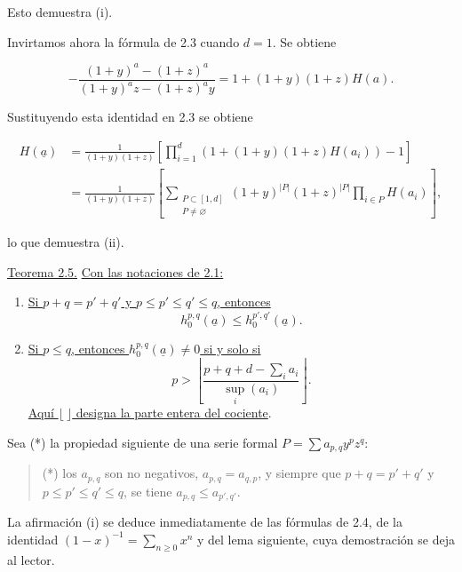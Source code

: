 Esto demuestra (i).

Invirtamos ahora la fórmula de 2.3 cuando $d=1$. Se obtiene

\begin{equation*}
-\frac{(1+y)^a-(1+z)^a}{(1+y)^az-(1+z)^ay}
=1+(1+y)(1+z)H(a).
\end{equation*}

Sustituyendo esta identidad en 2.3 se obtiene

\begin{align*}
H(\underline a)
&=\frac{1}{(1+y)(1+z)}\left[
\prod_{i=1}^d\left(1+(1+y)(1+z)H(a_i)\right)-1\right]\\
&=\frac{1}{(1+y)(1+z)}\left[
\sum_{\substack{P\subset[1,d]\\P\ne\varnothing}}
(1+y)^{|P|}(1+z)^{|P|}\prod_{i\in P}H(a_i)\right],
\end{align*}

lo que demuestra (ii).

\medskip
\noindent\underline{Teorema 2.5.}\quad
\underline{Con las notaciones de 2.1:}

\begin{enumerate}[label=(\roman*),leftmargin=2.6em]
\item \underline{Si $p+q=p'+q'$ y $p\leq p'\leq q'\leq q$, entonces}
\begin{equation*}
h_0^{p,q}(\underline a)\leq h_0^{p',q'}(\underline a).
\end{equation*}

\item \underline{Si $p\leq q$, entonces $h_0^{p,q}(\underline a)\ne0$ si
y solo si}
\begin{equation*}
p>\left\lfloor
\frac{p+q+d-\sum_i a_i}{\sup_i(a_i)}
\right\rfloor.
\end{equation*}
\underline{Aquí $\lfloor\ \rfloor$ designa la parte entera del cociente}.
\end{enumerate}

\pageoriginale

Sea (*) la propiedad siguiente de una serie formal
$P=\sum a_{p,q}y^pz^q$:

\begin{quote}
(*) los $a_{p,q}$ son no negativos, $a_{p,q}=a_{q,p}$, y siempre que
$p+q=p'+q'$ y $p\leq p'\leq q'\leq q$, se tiene
$a_{p,q}\leq a_{p',q'}$.
\end{quote}

La afirmación (i) se deduce inmediatamente de las fórmulas de 2.4, de la
identidad $(1-x)^{-1}=\sum_{n\geq0}x^n$ y del lema siguiente, cuya
demostración se deja al lector.

